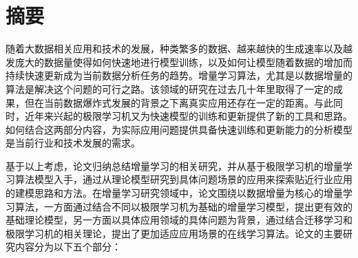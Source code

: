 \section{摘要}

随着大数据相关应用和技术的发展，种类繁多的数据、越来越快的生成速率以及越发庞大的数据量使得如何快速地进行模型训练，以及如何让模型随着数据的增加而持续快速更新成为当前数据分析任务的趋势。增量学习算法，尤其是以数据增量的算法是解决这个问题的可行之路。该领域的研究在过去几十年里取得了一定的成果，但在当前数据爆炸式发展的背景之下离真实应用还存在一定的距离。与此同时，近年来兴起的极限学习机又为快速模型的训练和更新提供了新的工具和思路。如何结合这两部分内容，为实际应用问题提供具备快速训练和更新能力的分析模型是当前行业和技术发展的需求。


基于以上考虑，论文归纳总结增量学习的相关研究，并从基于极限学习机的增量学习算法模型入手，通过从理论模型研究到具体问题场景的应用来探索贴近行业应用的建模思路和方法。在增量学习研究领域中，论文围绕以数据增量为核心的增量学习算法，一方面通过结合不同以极限学习机为基础的增量学习模型，提出更有效的基础理论模型，另一方面以具体应用领域的具体问题为背景，通过结合迁移学习和极限学习机的相关理论，提出了更加适应应用场景的在线学习算法。论文的主要研究内容分为以下五个部分：
